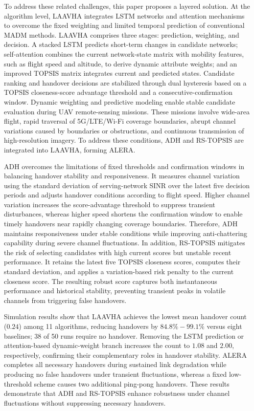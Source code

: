 \documentclass[10pt,a4paper]{article}
\begin{document}
To address these related challenges, this paper proposes a layered solution. At the algorithm level, LAAVHA integrates LSTM networks and attention mechanisms to overcome the fixed weighting and limited temporal prediction of conventional MADM methods. LAAVHA comprises three stages: prediction, weighting, and decision. A stacked LSTM predicts short-term changes in candidate networks; self-attention combines the current network-state matrix with mobility features, such as flight speed and altitude, to derive dynamic attribute weights; and an improved TOPSIS matrix integrates current and predicted states. Candidate ranking and handover decisions are stabilized through dual hysteresis based on a TOPSIS closeness-score advantage threshold and a consecutive-confirmation window. Dynamic weighting and predictive modeling enable stable candidate evaluation during UAV remote-sensing missions. These missions involve wide-area flight, rapid traversal of 5G/LTE/Wi-Fi coverage boundaries, abrupt channel variations caused by boundaries or obstructions, and continuous transmission of high-resolution imagery. To address these conditions, ADH and RS-TOPSIS are integrated into LAAVHA, forming ALERA.

ADH overcomes the limitations of fixed thresholds and confirmation windows in balancing handover stability and responsiveness. It measures channel variation using the standard deviation of serving-network SINR over the latest five decision periods and adjusts handover conditions according to flight speed. Higher channel variation increases the score-advantage threshold to suppress transient disturbances, whereas higher speed shortens the confirmation window to enable timely handovers near rapidly changing coverage boundaries. Therefore, ADH maintains responsiveness under stable conditions while improving anti-chattering capability during severe channel fluctuations. In addition, RS-TOPSIS mitigates the risk of selecting candidates with high current scores but unstable recent performance. It retains the latest five TOPSIS closeness scores, computes their standard deviation, and applies a variation-based risk penalty to the current closeness score. The resulting robust score captures both instantaneous performance and historical stability, preventing transient peaks in volatile channels from triggering false handovers.

Simulation results show that LAAVHA achieves the lowest mean handover count ($0.24$) among 11 algorithms, reducing handovers by $84.8\%-99.1\%$ versus eight baselines; 38 of 50 runs require no handover. Removing the LSTM prediction or attention-based dynamic-weight branch increases the count to $1.08$ and $2.00$, respectively, confirming their complementary roles in handover stability. ALERA completes all necessary handovers during sustained link degradation while producing no false handovers under transient fluctuations, whereas a fixed low-threshold scheme causes two additional ping-pong handovers. These results demonstrate that ADH and RS-TOPSIS enhance robustness under channel fluctuations without suppressing necessary handovers.
\end{document}
